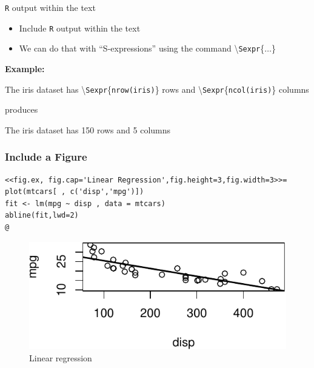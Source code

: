 \documentclass[10pt]{beamer}\usepackage[]{graphicx}\usepackage[]{color}
\makeatletter
\def\maxwidth{ %
  \ifdim\Gin@nat@width>\linewidth
    \linewidth
  \else
    \Gin@nat@width
  \fi
}
\newenvironment{kframe}{%
 \def\at@end@of@kframe{}%
 \ifinner\ifhmode%
  \def\at@end@of@kframe{\end{minipage}}%
  \begin{minipage}{\columnwidth}%
 \fi\fi%
 \def\FrameCommand##1{\hskip\@totalleftmargin \hskip-\fboxsep
 \colorbox{shadecolor}{##1}\hskip-\fboxsep
     \hskip-\linewidth \hskip-\@totalleftmargin \hskip\columnwidth}%
 \MakeFramed {\advance\hsize-\width
   \@totalleftmargin\z@ \linewidth\hsize
   \@setminipage}}%
 {\par\unskip\endMakeFramed%
 \at@end@of@kframe}
\newenvironment{knitrout}{}{} %
\makeatother
\begin{document}
\begin{frame}[fragile]{\texttt{R} output within the text}
\begin{itemize}
\item Include \texttt{R} output within the text
\item We can do that with ``S-expressions'' using the command \textbackslash \texttt{Sexpr}\{$\ldots$\}
\end{itemize}
\vspace{1cm}

\textbf{Example:} \vspace{0.3cm}

The iris dataset has \textbackslash \texttt{Sexpr}\{\texttt{nrow(iris)}\} rows and \textbackslash \texttt{Sexpr}\{\texttt{ncol(iris)}\} columns
\vspace{0.5cm}

produces \vspace{0.5cm}

The iris dataset has 150 rows and 5 columns


\end{frame}


\begin{frame}[fragile]
\frametitle{Include a Figure}
\scriptsize
\begin{knitrout}
\color{fgcolor}\begin{kframe}
\begin{verbatim}
<<fig.ex, fig.cap='Linear Regression',fig.height=3,fig.width=3>>=
plot(mtcars[ , c('disp','mpg')])
fit <- lm(mpg ~ disp , data = mtcars)
abline(fit,lwd=2)
@
\end{verbatim}
\end{kframe}
\end{knitrout}
\begin{knitrout}
\color{fgcolor}\begin{figure}

{\centering \includegraphics[width=\maxwidth]{figure/slr7-1} 

}

\caption[Linear regression]{Linear regression}\label{fig:slr7}
\end{figure}


\end{knitrout}
\end{frame}
\end{document}
